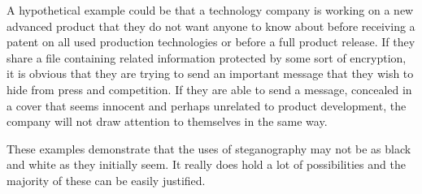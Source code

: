 A hypothetical example could be that a technology company is working on a new advanced product that they do not want anyone to know about before receiving a patent on all used production technologies or before a full product release.
If they share a file containing related information protected by some sort of encryption, it is obvious that they are trying to send an important message that they wish to hide from press and competition.
If they are able to send a message, concealed in a cover that seems innocent and perhaps unrelated to product development, the company will not draw attention to themselves in the same way.

These examples demonstrate that the uses of steganography may not be as black and white as they initially seem.
It really does hold a lot of possibilities and the majority of these can be easily justified.